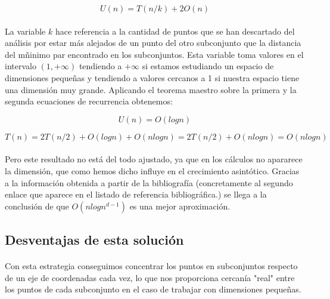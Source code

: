 \documentclass{article}
\begin{document}
		\begin{equation}
		U(n) = T(n/k) + 2O(n)
		\end{equation}

		\paragraph{}
		La variable $k$ hace referencia a la cantidad de puntos que se han descartado del análisis por estar más alejados de un punto del otro subconjunto que la distancia del mñinimo par encontrado en los subconjuntos. Esta variable toma valores en el intervalo $(1, +\infty)$ tendiendo a $+\infty$ si estamos estudiando un espacio de dimensiones pequeñas y tendiendo a valores cercanos a 1 si nuestra espacio tiene una dimensión muy grande. Aplicando el teorema maestro sobre la primera y la segunda ecuaciones de recurrencia obtenemos:
		
		\begin{equation}
			U(n) = O(logn)
		\end{equation}
		
		\begin{equation}
			T(n) = 2T(n/2) +  O(logn) + O(nlogn) = 2T(n/2) + O(nlogn) = O(nlogn)
		\end{equation}
		
		\paragraph{}
		Pero este resultado no está del todo ajustado, ya que en los cálculos no apararece la dimensión, que como hemos dicho influye en el crecimiento asintótico. Gracias a la información obtenida a partir de la bibliografía (concretamente al segundo enlace que aparece en el listado de referencia bibliográfica.) se llega a la conclusión de que $O(nlogn^{d-1})$ es una mejor aproximación.
		
	\subsection{Desventajas de esta solución}
	
		\paragraph{}
		Con esta estrategia conseguimos concentrar los puntos en subconjuntos respecto de un eje de coordenadas cada vez, lo que nos proporciona cercanía "real" entre los puntos de cada subconjunto en el caso de trabajar con dimensiones pequeñas.
		
\end{document}
